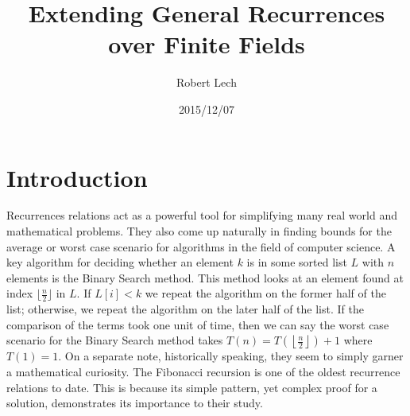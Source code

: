 \documentclass[a4paper]{article}
\title{Extending General Recurrences over Finite Fields}
\author{Robert Lech}
\date{2015/12/07}
\theoremstyle{definition}
\begin{document}
\maketitle

\section{Introduction}

Recurrences relations act as a powerful tool for simplifying many real world and mathematical problems. They also come up naturally in finding bounds for the average or worst case scenario for algorithms in the field of computer science. A key algorithm for deciding whether an element $k$ is in some sorted list $L$ with $n$ elements is the Binary Search method. This method looks at an element found at index $\lfloor\frac{n}{2}\rfloor$ in $L$. If $L[i]<k$ we repeat the algorithm on the former half of the list; otherwise, we repeat the algorithm on the later half of the list. If the comparison of the terms took one unit of time, then we can say the worst case scenario for the Binary Search method takes $T(n)=T\left(\left\lfloor\frac{n}{2}\right\rfloor\right)+1$ where $T(1)=1$.
On a separate note, historically speaking, they seem to simply garner a mathematical curiosity. The Fibonacci recursion is one of the oldest recurrence relations to date. This is because its simple pattern, yet complex proof for a solution, demonstrates its importance to their study. 
\end{document}
